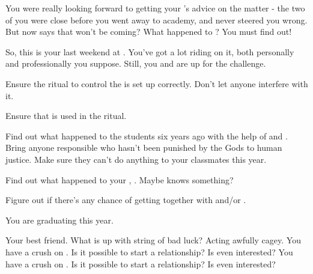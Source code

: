 \documentclass[char]{GL2020}
\begin{document}
You were really looking forward to getting your \cHeadDiplomat{\auncle}'s advice on the matter - the two of you were close before you went away to academy, and \cHeadDiplomat{\they} never steered you wrong. But now \cEbbPriest{} says that \cHeadDiplomat{} won't be coming? What happened to \cHeadDiplomat{\them}? You must find out!

So, this is your last weekend at \pSchool{}. You've got a lot riding on it, both personally and professionally you suppose. Still, you and \cInitiate{} are up for the challenge.


\begin{itemz}[Goals]
	\item  Ensure the ritual to control the is set up correctly. Don't let anyone interfere with it.
	\item Ensure that \iNet{} is used in the ritual.
	\item Find out what happened to the students six years ago with the help of \cHeir{} and \cLibAssist{}. Bring anyone responsible who hasn't been punished  by the Gods to human justice. Make sure they can't do anything to your classmates this year.
	\item Find out what happened to your \cHeadDiplomat{\auncle}, \cHeadDiplomat{}. Maybe \cEbbPriest{} knows something?
	\item Figure out if there's any chance of getting together with \cHeir{} and/or \cChupStudent{}.
\end{itemz}

\begin{itemz}[Notes]
	\item You are graduating this year.
\end{itemz}

\begin{contacts}
	\contact{\cInitiate{}} Your best friend. What is up with \cInitiate{\their} string of bad luck?
	\contact{\cLibrarian{}} Acting awfully cagey.
	\contact{\cHeir{}} You have a crush on \cHeir{\them}. Is it possible to start a relationship? Is \cHeir{} even interested?
	\contact{\cChupStudent{}} You have a crush on \cChupStudent{\them}. Is it possible to start a relationship? Is \cChupStudent{} even interested?
	
\end{contacts}
\end{document}
